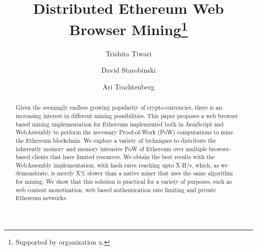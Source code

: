 \documentclass[runningheads]{llncs}
\begin{document}
%
\title{Distributed Ethereum Web Browser Mining\thanks{Supported by organization x.}}
%
%
\author{Trishita Tiwari \and
David Starobinski \and
Ari Trachtenberg}
%
%
%
\maketitle             
%
\begin{abstract}
Given the seemingly endless growing popularity of crypto-currencies, there is an increasing interest in different mining possibilities. This paper proposes a web browser based mining implementation for Ethereum implemented both in JavaScript and WebAssembly to perform the necessary Proof-of-Work (PoW) computations to mine the Ethereum blockchain. We explore a variety of techniques to distribute the inherently memory and memory intensive PoW of Ethereum over multiple browser-based clients that have limited resources. We obtain the best results with the WebAssembly implementation, with hash rates reaching upto X H/s, which, as we demonstrate, is merely X\% slower than a native miner that uses the same algorithm for mining. We show that this solution is practical for a variety of purposes, such as web content monetization, web based authentication rate limiting and private Ethereum networks.

\end{abstract}
%
%
%
\end{document}
